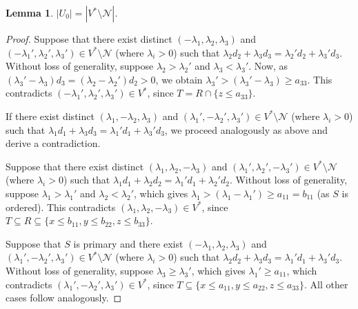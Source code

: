 \documentclass[12pt]{article}
\newtheorem{lemma}[thm]{Lemma}
\theoremstyle{remark}
\begin{document}
\begin{lemma}\label{lemma_U0_VN}
     $|U_0| = |V^* \setminus \mathcal{N}|$.
\end{lemma}

\begin{proof}
    Suppose that there exist distinct $(-\lambda_1,\lambda_2,\lambda_3)$ and $(-\lambda_1',\lambda_2',\lambda_3') \in V^* \setminus \mathcal{N}$ (where $\lambda_i > 0$) such that $\lambda_2d_2 + \lambda_3d_3 = \lambda_2'd_2 + \lambda_3'd_3$. Without loss of generality, suppose $\lambda_2 > \lambda_2'$ and $\lambda_3 < \lambda_3'$. Now, as $(\lambda_3'-\lambda_3)d_3 = (\lambda_2-\lambda_2')d_2 > 0$, we obtain $\lambda_3' > (\lambda_3'-\lambda_3) \geq a_{33}$. This contradicts $(-\lambda_1',\lambda_2',\lambda_3') \in V^*$, since $T = R \cap \{z \leq a_{33}\}$. 
    
   If there exist distinct $(\lambda_1,-\lambda_2,\lambda_3)$ and $ (\lambda_1',-\lambda_2',\lambda_3') \in V^* \setminus \mathcal{N}$ (where $\lambda_i > 0$) such that $\lambda_1d_1 + \lambda_3d_3 = \lambda_1'd_1 + \lambda_3'd_3$, we proceed analogously as above and derive a contradiction. 
    
   Suppose that there exist distinct $(\lambda_1,\lambda_2,-\lambda_3)$ and $ (\lambda_1',\lambda_2',-\lambda_3') \in V^* \setminus \mathcal{N}$ (where $\lambda_i > 0$) such that $\lambda_1d_1 + \lambda_2d_2 = \lambda_1'd_1 + \lambda_2'd_2$. Without loss of generality, suppose $\lambda_1 > \lambda_1'$ and $\lambda_2 < \lambda_2'$, which gives $\lambda_1 > (\lambda_1 - \lambda_1') \geq a_{11} = b_{11}$ (as $S$ is ordered). This contradicts $(\lambda_1,\lambda_2,-\lambda_3) \in V^*$, since $T \subseteq R \subseteq \{x \leq b_{11}, y \leq b_{22}, z \leq b_{33}\}$.


   Suppose that $S$ is primary and there exist $(-\lambda_1,\lambda_2,\lambda_3)$ and $(\lambda_1',-\lambda_2',\lambda_3') \in V^* \setminus \mathcal{N}$ (where $\lambda_i > 0$) such that $\lambda_2d_2 + \lambda_3d_3 = \lambda_1'd_1 + \lambda_3'd_3$. Without loss of generality, suppose $\lambda_3 \geq \lambda_3'$, which gives $\lambda_1' \geq a_{11}$, which contradicts  $(\lambda_1',-\lambda_2',\lambda_3') \in V^*$, since $T \subseteq \{x \leq a_{11}, y \leq a_{22}, z \leq a_{33}\}$. All other cases follow analogously. 


\end{proof}
\end{document}
